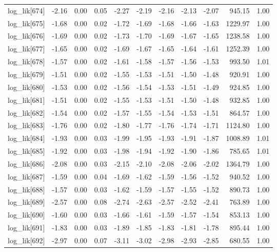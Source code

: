 \begin{table}[ht]
\begin{tabular}{rrrrrrrrrrr}
  log\_lik[674] & -2.16 & 0.00 & 0.05 & -2.27 & -2.19 & -2.16 & -2.13 & -2.07 & 945.15 & 1.00 \\ 
  log\_lik[675] & -1.68 & 0.00 & 0.02 & -1.72 & -1.69 & -1.68 & -1.66 & -1.63 & 1229.97 & 1.00 \\ 
  log\_lik[676] & -1.69 & 0.00 & 0.02 & -1.73 & -1.70 & -1.69 & -1.67 & -1.65 & 1238.58 & 1.00 \\ 
  log\_lik[677] & -1.65 & 0.00 & 0.02 & -1.69 & -1.67 & -1.65 & -1.64 & -1.61 & 1252.39 & 1.00 \\ 
  log\_lik[678] & -1.57 & 0.00 & 0.02 & -1.61 & -1.58 & -1.57 & -1.56 & -1.53 & 993.50 & 1.01 \\ 
  log\_lik[679] & -1.51 & 0.00 & 0.02 & -1.55 & -1.53 & -1.51 & -1.50 & -1.48 & 920.91 & 1.00 \\ 
  log\_lik[680] & -1.53 & 0.00 & 0.02 & -1.56 & -1.54 & -1.53 & -1.51 & -1.49 & 924.85 & 1.00 \\ 
  log\_lik[681] & -1.51 & 0.00 & 0.02 & -1.55 & -1.53 & -1.51 & -1.50 & -1.48 & 932.85 & 1.00 \\ 
  log\_lik[682] & -1.54 & 0.00 & 0.02 & -1.57 & -1.55 & -1.54 & -1.53 & -1.51 & 864.57 & 1.00 \\ 
  log\_lik[683] & -1.76 & 0.00 & 0.02 & -1.80 & -1.77 & -1.76 & -1.74 & -1.71 & 1124.80 & 1.00 \\ 
  log\_lik[684] & -1.93 & 0.00 & 0.03 & -1.99 & -1.95 & -1.93 & -1.91 & -1.87 & 1008.89 & 1.01 \\ 
  log\_lik[685] & -1.92 & 0.00 & 0.03 & -1.98 & -1.94 & -1.92 & -1.90 & -1.86 & 785.65 & 1.01 \\ 
  log\_lik[686] & -2.08 & 0.00 & 0.03 & -2.15 & -2.10 & -2.08 & -2.06 & -2.02 & 1364.79 & 1.00 \\ 
  log\_lik[687] & -1.59 & 0.00 & 0.04 & -1.69 & -1.62 & -1.59 & -1.56 & -1.52 & 940.52 & 1.00 \\ 
  log\_lik[688] & -1.57 & 0.00 & 0.03 & -1.62 & -1.59 & -1.57 & -1.55 & -1.52 & 890.73 & 1.00 \\ 
  log\_lik[689] & -2.57 & 0.00 & 0.08 & -2.74 & -2.63 & -2.57 & -2.52 & -2.41 & 763.89 & 1.00 \\ 
  log\_lik[690] & -1.60 & 0.00 & 0.03 & -1.66 & -1.61 & -1.59 & -1.57 & -1.54 & 853.13 & 1.00 \\ 
  log\_lik[691] & -1.83 & 0.00 & 0.03 & -1.89 & -1.85 & -1.83 & -1.81 & -1.78 & 895.44 & 1.00 \\ 
  log\_lik[692] & -2.97 & 0.00 & 0.07 & -3.11 & -3.02 & -2.98 & -2.93 & -2.85 & 680.55 & 1.00 \\ 

\end{tabular}
\end{table}
